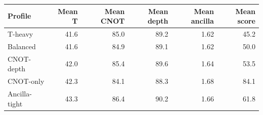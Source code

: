 \begin{tabular}{lrrrrr}
\toprule
Profile & Mean T & Mean CNOT & Mean depth & Mean ancilla & Mean score \\
\midrule
T-heavy & 41.6 & 85.0 & 89.2 & 1.62 & 45.2 \\
Balanced & 41.6 & 84.9 & 89.1 & 1.62 & 50.0 \\
CNOT-depth & 42.0 & 85.4 & 89.6 & 1.64 & 53.5 \\
CNOT-only & 42.3 & 84.1 & 88.3 & 1.68 & 84.1 \\
Ancilla-tight & 43.3 & 86.4 & 90.2 & 1.66 & 61.8 \\
\bottomrule
\end{tabular}
